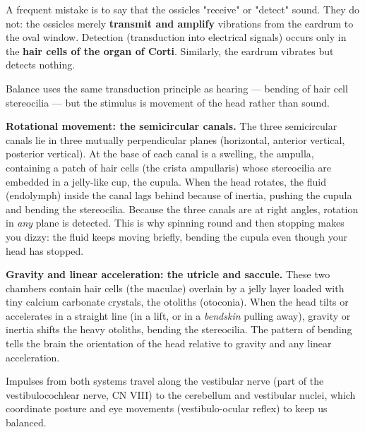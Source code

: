 \documentclass[11pt]{article}
\newcommand{\cle}[1]{{\popxbold\color{popdark}#1}}
\newcounter{popsec}
\newcounter{popsub}
\newcommand{\courssub}[1]{%
  \stepcounter{popsub}%
  \par\vspace{9pt}\noindent{\popxbold\fontsize{11.5}{13}\selectfont\color{popink}{\color{poporange}\thepopsec.\thepopsub}\hspace{6pt}#1}\par\nopagebreak\vspace{4pt}
}
\begin{document}
\begin{attention}
A frequent mistake is to say that the ossicles "receive" or "detect" sound. They do not: the ossicles merely \textbf{transmit and amplify} vibrations from the eardrum to the oval window. Detection (transduction into electrical signals) occurs only in the \textbf{hair cells of the organ of Corti}. Similarly, the eardrum vibrates but detects nothing.
\end{attention}

\courssub{Balance: The Vestibular Apparatus}

Balance uses the same transduction principle as hearing — bending of hair cell stereocilia — but the stimulus is movement of the head rather than sound.

\textbf{Rotational movement: the semicircular canals.} The three semicircular canals lie in three mutually perpendicular planes (horizontal, anterior vertical, posterior vertical). At the base of each canal is a swelling, the \cle{ampulla}, containing a patch of hair cells (the \cle{crista ampullaris}) whose stereocilia are embedded in a jelly-like cup, the \cle{cupula}. When the head rotates, the fluid (endolymph) inside the canal lags behind because of inertia, pushing the cupula and bending the stereocilia. Because the three canals are at right angles, rotation in \emph{any} plane is detected. This is why spinning round and then stopping makes you dizzy: the fluid keeps moving briefly, bending the cupula even though your head has stopped.

\textbf{Gravity and linear acceleration: the utricle and saccule.} These two chambers contain hair cells (the \cle{maculae}) overlain by a jelly layer loaded with tiny calcium carbonate crystals, the \cle{otoliths} (otoconia). When the head tilts or accelerates in a straight line (in a lift, or in a \emph{bendskin} pulling away), gravity or inertia shifts the heavy otoliths, bending the stereocilia. The pattern of bending tells the brain the orientation of the head relative to gravity and any linear acceleration.

Impulses from both systems travel along the \cle{vestibular nerve} (part of the vestibulocochlear nerve, CN VIII) to the \cle{cerebellum} and vestibular nuclei, which coordinate posture and eye movements (vestibulo-ocular reflex) to keep us balanced.
\end{document}
